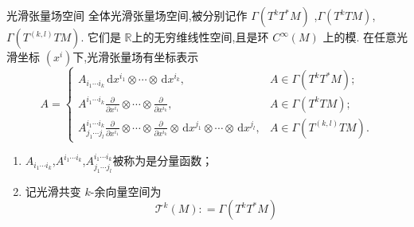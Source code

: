 \documentclass[../../几何与拓扑.tex]{subfiles}
\begin{document}
\begin{proposition}{光滑张量场空间}
    全体光滑张量场空间,被分别记作 $ \Gamma\left( T^{k}T^{*}M \right)  $ ,$ \Gamma\left( T^{k}TM \right)  $,$ \Gamma\left( T^{\left( k,l \right)} TM \right) $.
    它们是 $ \mathbb{R}  $上的无穷维线性空间,且是环 $ C^{\infty}\left( M \right)  $    上的模.
    在任意光滑坐标 $ \left( x^{i} \right)  $下,光滑张量场有坐标表示 $$
    A= \begin{cases} A_{i_1\cdots i_{k}}\,\mathrm{d} x^{i_1}\otimes \cdots \otimes \,\mathrm{d} x^{i_{k}}  ,& A \in \Gamma\left( T^{k}T^{*}M \right);\\ 
     A^{i_1\cdots i_{k}}\frac{\partial }{\partial x^{i_1}} \otimes \cdots \otimes \frac{\partial }{\partial x^{i_{k}}},& A \in \Gamma\left( T^{k}TM \right);\\ 
      A^{i_1\cdots i_{k}}_{j_1\cdots j_{l}} \frac{\partial }{\partial x^{i_1}}\otimes \cdots \otimes \frac{\partial }{\partial x^{i_{k}}}\otimes \,\mathrm{d} x^{j_1}\otimes \cdots \otimes \,\mathrm{d} x^{j_{l}} ,& A \in \Gamma\left( T^{\left( k,l \right) }TM \right) .  \end{cases}
    $$ 
\end{proposition}
\begin{remark}
    \begin{enumerate}
        \item $ A_{i_1\cdots i_{k}} $,$ A^{i_1\cdots i_{k}} $,$ A^{i_1\cdots i_{k}}_{j_1\cdots j_{l}} $被称为是分量函数；
        \item 记光滑共变 $ k $-余向量空间为 $$
        \mathscr{T}^{k}\left( M \right): = \Gamma\left( T^{k}T^{*}M \right)  
        $$    
    \end{enumerate}
    
\end{remark}
\end{document}
